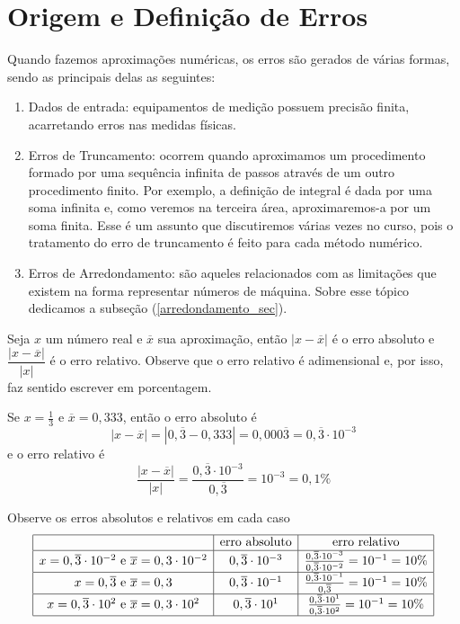 \section{Origem e Definição de Erros}
Quando fazemos aproximações numéricas, os erros são gerados de várias formas, sendo as principais delas as seguintes:
\begin{enumerate}
 \item Dados de entrada: equipamentos de medição possuem precisão finita, acarretando erros nas medidas físicas.
 \item Erros de Truncamento: ocorrem quando aproximamos um procedimento formado por uma sequência infinita de passos através de um outro procedimento finito. Por exemplo, a definição de integral é dada por uma soma infinita e, como veremos na terceira área, aproximaremos-a por um soma finita. Esse é um assunto que discutiremos várias vezes no curso, pois o tratamento do erro de truncamento é feito para cada método numérico.
 \item Erros de Arredondamento: são aqueles relacionados com as limitações que existem na forma representar números de máquina. Sobre esse tópico dedicamos a subseção (\ref{arredondamento_sec}).
\end{enumerate}


\begin{defn} Seja $x$ um número real e $\overline{x}$ sua aproximação, então $|x-\overline{x}|$ é o erro absoluto e $\dfrac{|x-\overline{x}|}{|x|}$ é o erro relativo. Observe que o erro relativo é adimensional e, por isso, faz sentido escrever em porcentagem.
\end{defn}
\begin{ex}
Se $x=\frac{1}{3}$ e $\overline{x}=0,333$, então o erro absoluto é
$$
|x-\overline{x}|=|0,\overline{3}-0,333|=0,000\overline{3}=0,\overline{3}\cdot 10^{-3}
$$
e o erro relativo é
$$
\frac{|x-\overline{x}|}{|x|}=\frac{0,\overline{3}\cdot 10^{-3}}{0,\overline{3}}=10^{-3}=0,1\%
$$
\end{ex}

\begin{ex}
Observe os erros absolutos e relativos em cada caso
$$
\begin{array}{|c|c|c|}
\hline
&\hbox{erro absoluto}&\hbox{erro relativo}\\
\hline
x=0,\overline{3}\cdot 10^{-2}\ \hbox{e}\ \overline{x}=0,3\cdot 10^{-2}&0,\overline{3}\cdot 10^{-3}&\frac{0,\overline{3}\cdot 10^{-3}}{0,\overline{3}\cdot 10^{-2}}=10^{-1}=10\%\\
\hline
x=0,\overline{3}\ \hbox{e}\ \overline{x}=0,3&0,\overline{3}\cdot 10^{-1}&\frac{0,\overline{3}\cdot 10^{-1}}{0,\overline{3}}=10^{-1}=10\%\\
\hline
x=0,\overline{3}\cdot 10^{2}\ \hbox{e}\ \overline{x}=0,3\cdot 10^{2}&0,\overline{3}\cdot 10^{1}&\frac{0,\overline{3}\cdot 10^{1}}{0,\overline{3}\cdot 10^{2}}=10^{-1}=10\%\\
\hline
\end{array}
$$
\end{ex}


